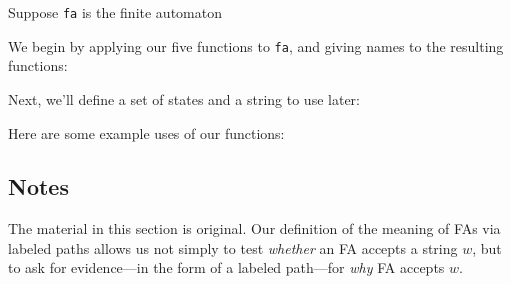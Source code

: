 Suppose \texttt{fa} is the finite automaton
\begin{center}

\end{center}
We begin by applying our five functions to \texttt{fa}, and giving names
to the resulting functions:

Next, we'll define a set of states and a string to use later:

Here are some example uses of our functions:


\subsection{Notes}

The material in this section is original.  Our definition of the
meaning of FAs via labeled paths allows us not simply to test \emph{whether}
an FA accepts a string $w$, but to ask for evidence---in the form of a
labeled path---for \emph{why} FA accepts $w$.

%
%

